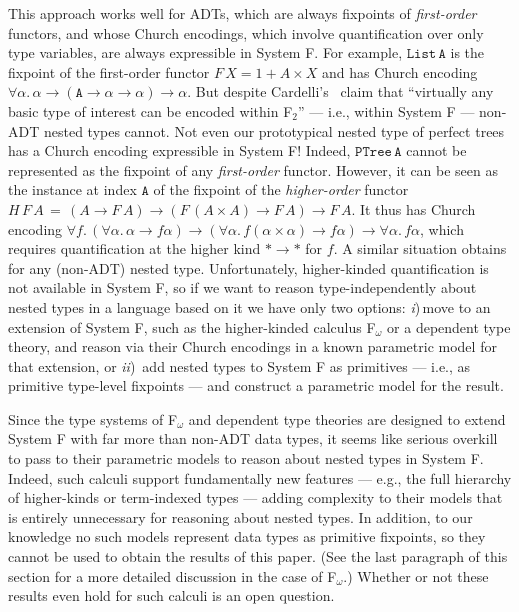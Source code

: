 \documentclass{lmcs}
\theoremstyle{plain}\newtheorem{satz}[thm]{Satz}
\begin{document}
This approach works well for ADTs, which are always fixpoints of {\em
  first-order} functors, and whose Church encodings, which involve
quantification over only type variables, are always expressible in
System F. For example, $\mathtt{List\,A}$ is the fixpoint of the
first-order functor $F\,X = 1 + A \times X$ and has Church encoding
$\forall \alpha. \, \alpha \to (\mathtt{A} \to \alpha \to \alpha) \to
\alpha$. But despite Cardelli's~\cite{car97} claim that ``virtually
any basic type of interest can be encoded within F$_2$'' --- i.e.,
within System F --- non-ADT nested types cannot.  Not even our
prototypical nested type of perfect trees has a Church encoding
expressible in System F!  Indeed, $\mathtt{PTree\,A}$ cannot be
represented as the fixpoint of any {\em first-order} functor. However,
it can be seen as the instance at index $\mathtt{A}$ of the fixpoint
of the {\em higher-order} functor $H\,F\,A\,=\, (A \to F\,A) \to (F
\,(A \times A) \to F\,A) \to F\,A$. It thus has Church encoding
$\forall f.\, (\forall \alpha.\,\alpha \to f\alpha) \to (\forall
\alpha. \,f (\alpha \times \alpha) \to f\alpha) \to \forall \alpha.\,
f\alpha$, which requires quantification at the higher kind $* \to *$
for $f$. A similar situation obtains for any (non-ADT) nested
type. Unfortunately, higher-kinded quantification is not available in
System F, so if we want to reason type-independently about nested
types in a language based on it we have only two options: {\em
  i})\,move to an extension of System F, such as the higher-kinded
calculus F$_\omega$ or a dependent type theory, and reason via their
Church encodings in a known parametric model for that extension, or
{\em ii})\, add nested types to System F as primitives --- i.e., as
primitive type-level fixpoints --- and construct a parametric model
for the result.

Since the type systems of F$_\omega$ and dependent type theories are
designed to extend System F with far more than non-ADT data types, it
seems like serious overkill to pass to their parametric models to
reason about nested types in System F. Indeed, such calculi support
fundamentally new features --- e.g., the full hierarchy of
higher-kinds or term-indexed types --- adding complexity to their
models that is entirely unnecessary for reasoning about nested types.
In addition, to our knowledge no such models represent data types as
primitive fixpoints, so they cannot be used to obtain the results of
this paper.  (See the last paragraph of this section for a more
detailed discussion in the case of F$_\omega$.) Whether or not these
results even hold for such calculi is an open question.
\end{document}
